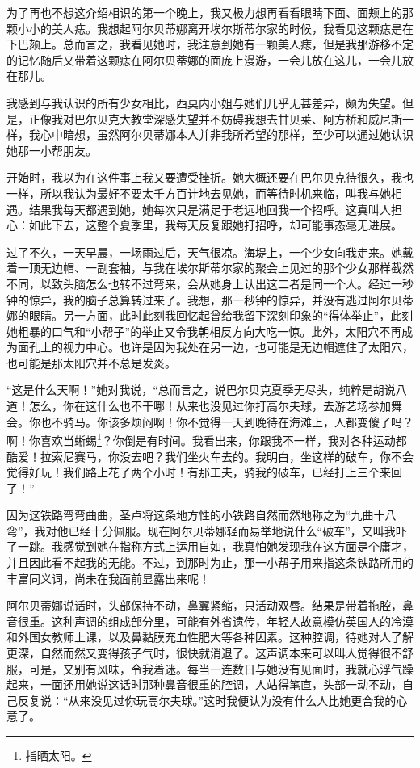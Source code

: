 \par 为了再也不想这介绍相识的第一个晚上，我又极力想再看看眼睛下面、面颊上的那颗小小的美人痣。我想起阿尔贝蒂娜离开埃尔斯蒂尔家的时候，我看见这颗痣是在下巴颏上。总而言之，我看见她时，我注意到她有一颗美人痣，但是我那游移不定的记忆随后又带着这颗痣在阿尔贝蒂娜的面庞上漫游，一会儿放在这儿，一会儿放在那儿。
\par 我感到与我认识的所有少女相比，西莫内小姐与她们几乎无甚差异，颇为失望。但是，正像我对巴尔贝克大教堂深感失望并不妨碍我想去甘贝莱、阿方桥和威尼斯一样，我心中暗想，虽然阿尔贝蒂娜本人并非我所希望的那样，至少可以通过她认识她那一小帮朋友。
\par 开始时，我以为在这件事上我又要遭受挫折。她大概还要在巴尔贝克待很久，我也一样，所以我认为最好不要太千方百计地去见她，而等待时机来临，叫我与她相遇。结果我每天都遇到她，她每次只是满足于老远地回我一个招呼。这真叫人担心：如此下去，这整个夏季里，我每天反复跟她打招呼，却可能事态毫无进展。
\par 过了不久，一天早晨，一场雨过后，天气很凉。海堤上，一个少女向我走来。她戴着一顶无边帽、一副套袖，与我在埃尔斯蒂尔家的聚会上见过的那个少女那样截然不同，以致头脑怎么也转不过弯来，会从她身上认出这二者是同一个人。经过一秒钟的惊异，我的脑子总算转过来了。我想，那一秒钟的惊异，并没有逃过阿尔贝蒂娜的眼睛。另一方面，此时此刻我回忆起曾给我留下深刻印象的“得体举止”，此刻她粗暴的口气和“小帮子”的举止又令我朝相反方向大吃一惊。此外，太阳穴不再成为面孔上的视力中心。也许是因为我处在另一边，也可能是无边帽遮住了太阳穴，也可能是那太阳穴并不总是发炎。
\par “这是什么天啊！”她对我说，“总而言之，说巴尔贝克夏季无尽头，纯粹是胡说八道！怎么，你在这什么也不干哪！从来也没见过你打高尔夫球，去游艺场参加舞会。你也不骑马。你该多烦闷啊！你不觉得一天到晚待在海滩上，人都变傻了吗？啊！你喜欢当蜥蜴\footnote{指晒太阳。}？你倒是有时间。我看出来，你跟我不一样，我对各种运动都酷爱！拉索尼赛马，你没去吧？我们坐火车去的。我明白，坐这样的破车，你不会觉得好玩！我们路上花了两个小时！有那工夫，骑我的破车，已经打上三个来回了！”
\par 因为这铁路弯弯曲曲，圣卢将这条地方性的小铁路自然而然地称之为“九曲十八弯”，我对他已经十分佩服。现在阿尔贝蒂娜轻而易举地说什么“破车”，又叫我吓了一跳。我感觉到她在指称方式上运用自如，我真怕她发现我在这方面是个庸才，并且因此看不起我的无能。不过，到那时为止，那一小帮子用来指这条铁路所用的丰富同义词，尚未在我面前显露出来呢！
\par 阿尔贝蒂娜说话时，头部保持不动，鼻翼紧缩，只活动双唇。结果是带着拖腔，鼻音很重。这种声调的组成部分里，可能有外省遗传，年轻人故意模仿英国人的冷漠和外国女教师上课，以及鼻黏膜充血性肥大等各种因素。这种腔调，待她对人了解更深，自然而然又变得孩子气时，很快就消退了。这声调本来可以叫人觉得很不舒服，可是，又别有风味，令我着迷。每当一连数日与她没有见面时，我就心浮气躁起来，一面还用她说这话时那种鼻音很重的腔调，人站得笔直，头部一动不动，自己反复说：“从来没见过你玩高尔夫球。”这时我便认为没有什么人比她更合我的心意了。
